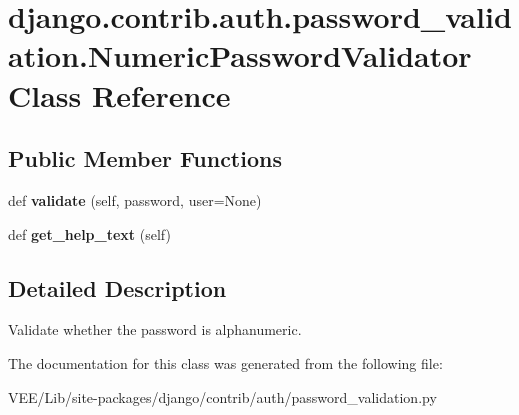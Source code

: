 \hypertarget{classdjango_1_1contrib_1_1auth_1_1password__validation_1_1_numeric_password_validator}{}\section{django.\+contrib.\+auth.\+password\+\_\+validation.\+Numeric\+Password\+Validator Class Reference}
\label{classdjango_1_1contrib_1_1auth_1_1password__validation_1_1_numeric_password_validator}
\subsection*{Public Member Functions}
\begin{DoxyCompactItemize}
\item 
\mbox{\label{classdjango_1_1contrib_1_1auth_1_1password__validation_1_1_numeric_password_validator_a8306be1105f33d618b420f611a697239}} 
def {\bfseries validate} (self, password, user=None)
\item 
\mbox{\label{classdjango_1_1contrib_1_1auth_1_1password__validation_1_1_numeric_password_validator_a09bd7abb9f1db21a551b96456fc747d9}} 
def {\bfseries get\+\_\+help\+\_\+text} (self)
\end{DoxyCompactItemize}


\subsection{Detailed Description}
\begin{DoxyVerb}Validate whether the password is alphanumeric.
\end{DoxyVerb}
 

The documentation for this class was generated from the following file\+:\begin{DoxyCompactItemize}
\item 
V\+E\+E/\+Lib/site-\/packages/django/contrib/auth/password\+\_\+validation.\+py\end{DoxyCompactItemize}
